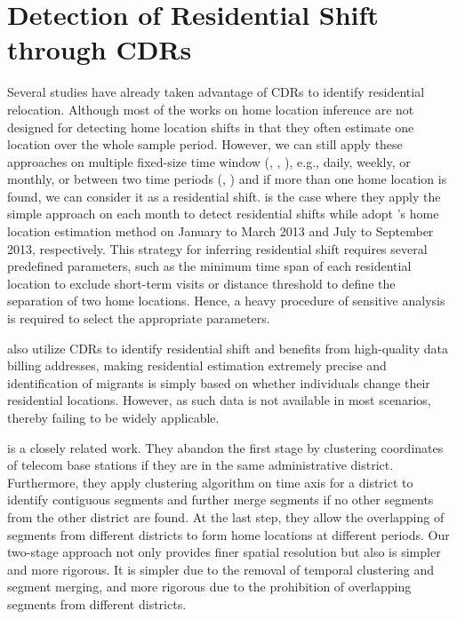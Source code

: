 \section{Detection of Residential Shift through CDRs}
Several studies have already taken advantage of CDRs to identify residential relocation. Although most of the works on home location inference are not designed for detecting home location shifts in that they often estimate one location over the whole sample period. However, we can still apply these approaches on multiple fixed-size time window (\cite{blumenstock2012inferring}, \cite{phithakkitnukoon2022inferring}, \cite{blumenstock2025migration}), e.g., daily, weekly, or monthly, or between two time periods (\cite{lai2019exploring}, \cite{dias2022framework}) and if more than one home location is found, we can consider it as a residential shift. \cite{phithakkitnukoon2022inferring} is the case where they apply the simple approach on each month to detect residential shifts while \cite{dias2022framework} adopt \cite{isaacman2011identifying}'s home location estimation method on January to March 2013 and July to September 2013, respectively. This strategy for inferring residential shift requires several predefined parameters, such as the minimum time span of each residential location to exclude short-term visits or distance threshold to define the separation of two home locations. Hence, a heavy procedure of sensitive analysis is required to select the appropriate parameters.

\cite{buchel2020calling} also utilize CDRs to identify residential shift and benefits from high-quality data billing addresses, making residential estimation extremely precise and identification of migrants is simply based on whether individuals change their residential locations. However, as such data is not available in most scenarios, thereby failing to be widely applicable.

\cite{chi2020general} is a closely related work. They abandon the first stage by clustering coordinates of telecom base stations if they are in the same administrative district. Furthermore, they apply clustering algorithm on time axis for a district to identify contiguous segments and further merge segments if no other segments from the other district are found. At the last step, they allow the overlapping of segments from different districts to form home locations at different periods. Our two-stage approach not only provides finer spatial resolution but also is simpler and more rigorous. It is simpler due to the removal of temporal clustering and segment merging, and more rigorous due to the prohibition of overlapping segments from different districts.


